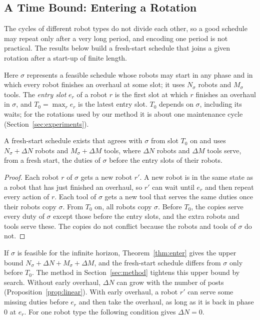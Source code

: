 \subsection{A Time Bound: Entering a Rotation}
\label{sec:time}

The cycles of different robot types do not divide each other, so a good schedule may repeat only after a very long period, and encoding one period is not practical.
The results below build a fresh-start schedule that joins a given rotation after a start-up of finite length.

Here $\sigma$ represents a feasible schedule whose robots may start in any phase and in which every robot finishes an overhaul at some slot; it uses $N_\sigma$ robots and $M_\sigma$ tools.
The \emph{entry slot} $e_r$ of a robot $r$ is the first slot at which $r$ finishes an overhaul in $\sigma$, and $T_0 = \max_r e_r$ is the latest entry slot.
$T_0$ depends on $\sigma$, including its waits; for the rotations used by our method it is about one maintenance cycle (Section~\ref{sec:experiments}).

\begin{theorem}
\label{thm:enter}
A fresh-start schedule exists that agrees with $\sigma$ from slot $T_0$ on and uses $N_\sigma + \Delta N$ robots and $M_\sigma + \Delta M$ tools, where $\Delta N$ robots and $\Delta M$ tools serve, from a fresh start, the duties of $\sigma$ before the entry slots of their robots.
\end{theorem}

\begin{proof}
Each robot $r$ of $\sigma$ gets a new robot $r'$.
A new robot is in the same state as a robot that has just finished an overhaul, so $r'$ can wait until $e_r$ and then repeat every action of $r$.
Each tool of $\sigma$ gets a new tool that serves the same duties once their robots copy $\sigma$.
From $T_0$ on, all robots copy $\sigma$.
Before $T_0$, the copies serve every duty of $\sigma$ except those before the entry slots, and the extra robots and tools serve these.
The copies do not conflict because the robots and tools of $\sigma$ do not.
\end{proof}

If $\sigma$ is feasible for the infinite horizon, Theorem~\ref{thm:enter} gives the upper bound $N_\sigma + \Delta N + M_\sigma + \Delta M$, and the fresh-start schedule differs from $\sigma$ only before $T_0$.
The method in Section~\ref{sec:method} tightens this upper bound by search.
Without early overhaul, $\Delta N$ can grow with the number of posts (Proposition~\ref{prop:linear}).
With early overhaul, a robot $r'$ can serve some missing duties before $e_r$ and then take the overhaul, as long as it is back in phase $0$ at $e_r$.
For one robot type the following condition gives $\Delta N = 0$.


